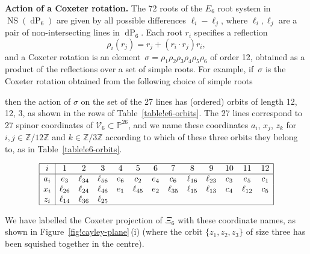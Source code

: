 \documentclass[10pt,a4paper]{amsart}
\numberwithin{equation}{section}
\theoremstyle{definition}
\newcommand{\PP}{\mathbb{P}}
\newcommand{\ZZ}{\mathbb{Z}}
\DeclareMathOperator{\NS}{NS}
\DeclareMathOperator{\dP}{dP}
\begin{document}
{\bf Action of a Coxeter rotation.}
The 72 roots of the $E_6$ root system in $\NS(\dP_6)$ are given by all possible differences $\ell_i-\ell_j$, where $\ell_i,\ell_j$ are a pair of non-intersecting lines in $\dP_6$. Each root $r_i$ specifies a reflection \[\rho_i(r_j) = r_j + (r_i\cdot r_j)r_i,\] and a Coxeter rotation is an element~${\sigma=\rho_1\rho_2\rho_3\rho_4\rho_5\rho_6}$ of order 12, obtained as a product of the reflections over a set of simple roots. For example, if~$\sigma$ is the Coxeter rotation obtained from the following choice of simple roots
\begin{center}
\end{center}
then the action of $\sigma$ on the set of the 27 lines has (ordered) orbits of length 12, 12, 3, as shown in the rows of Table~\ref{table!e6-orbits}. The 27 lines correspond to 27 spinor coordinates of $\mathcal V_6\subset\PP^{26}$, and we name these coordinates $a_i$, $x_j$, $z_k$ for $i,j\in\ZZ/12\ZZ$ and $k\in\ZZ/3\ZZ$ according to which of these three orbits they belong to, as in Table~\ref{table!e6-orbits}.
\begin{table}[htbp]\renewcommand{\arraystretch}{1.2}
$$\begin{array}{|c|cccccc cccccc|} \hline
i & 1 & 2 & 3 & 4 & 5 & 6 & 7 & 8 & 9 & 10 & 11 & 12 \\ \hline
a_i & e_3 & \ell_{34} & \ell_{56} & e_6 & c_2 & e_4 & c_6 & \ell_{16} & \ell_{23} & c_3 & e_5 & c_1 \\
x_i & \ell_{26} & \ell_{24} & \ell_{46} & e_1 & \ell_{45} & e_2 & \ell_{35} & \ell_{15} & \ell_{13} & c_4 & \ell_{12} & c_5 \\
z_i & \ell_{14} & \ell_{36} & \ell_{25} & & & & & & & & & \\ \hline
\end{array}$$
\caption{The frozen variables $a_i$ and cluster variables $x_i$, $z_i$ for $\mathcal A_6$.}
\label{table!e6-orbits}
\end{table}%
We have labelled the Coxeter projection of $\Xi_6$ with these coordinate names, as shown in Figure~\ref{fig!cayley-plane}\,(i) (where the orbit $\{z_1,z_2,z_3\}$ of size three has been squished together in the centre).
\end{document}
